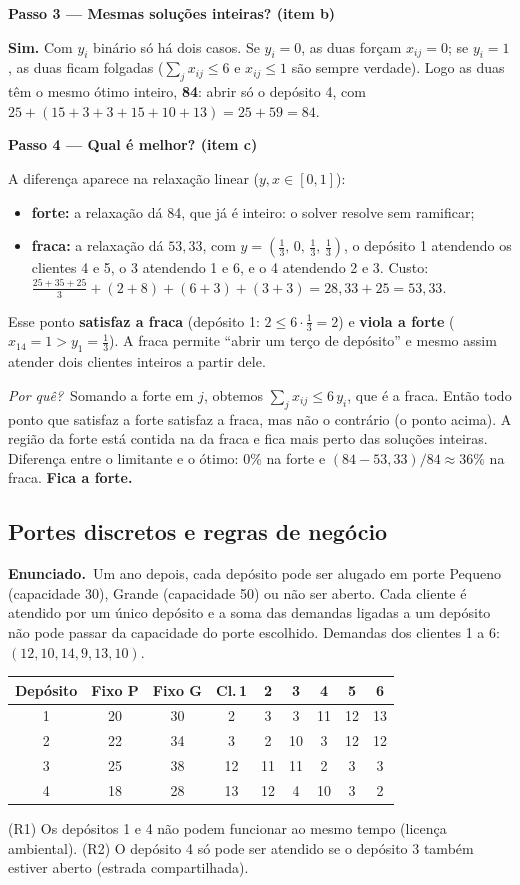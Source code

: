 \documentclass[11pt,a4paper]{article}
\newcommand{\enunciado}{\par\textbf{Enunciado.}\ }
\newcommand{\passo}[1]{\par\medskip\textbf{#1}\par}
\newcommand{\porque}{\textit{Por quê?}\ }
\begin{document}
\passo{Passo 3 --- Mesmas soluções inteiras? (item b)}
\textbf{Sim.} Com $y_i$ binário só há dois casos. Se $y_i=0$, as duas forçam $x_{ij}=0$; se $y_i=1$, as duas
ficam folgadas ($\sum_j x_{ij}\le6$ e $x_{ij}\le1$ são sempre verdade). Logo as duas têm o mesmo ótimo inteiro,
\textbf{84}: abrir só o depósito 4, com $25 + (15+3+3+15+10+13) = 25+59 = 84$.

\passo{Passo 4 --- Qual é melhor? (item c)}
A diferença aparece na relaxação linear ($y,x\in[0,1]$):
\begin{itemize}
  \item \textbf{forte:} a relaxação dá 84, que já é inteiro: o solver resolve sem ramificar;
  \item \textbf{fraca:} a relaxação dá $53{,}33$, com $y=(\tfrac13,\,0,\,\tfrac13,\,\tfrac13)$, o depósito 1 atendendo os
        clientes 4 e 5, o 3 atendendo 1 e 6, e o 4 atendendo 2 e 3. Custo:
        $\tfrac{25+35+25}{3} + (2+8)+(6+3)+(3+3) = 28{,}33+25 = 53{,}33$.
\end{itemize}
Esse ponto \textbf{satisfaz a fraca} (depósito 1: $2\le6\cdot\tfrac13=2$) e \textbf{viola a forte}
($x_{14}=1>y_1=\tfrac13$). A fraca permite ``abrir um terço de depósito'' e mesmo assim atender dois clientes
inteiros a partir dele.

\porque Somando a forte em $j$, obtemos $\sum_j x_{ij}\le6\,y_i$, que é a fraca. Então todo ponto que satisfaz
a forte satisfaz a fraca, mas não o contrário (o ponto acima). A região da forte está contida na da fraca e fica
mais perto das soluções inteiras. Diferença entre o limitante e o ótimo: 0\% na forte e
$(84-53{,}33)/84\approx36\%$ na fraca. \textbf{Fica a forte.}

\subsection{Portes discretos e regras de negócio}
\enunciado Um ano depois, cada depósito pode ser alugado em porte Pequeno (capacidade 30), Grande
(capacidade 50) ou não ser aberto. Cada cliente é atendido por um único depósito e a soma das demandas
ligadas a um depósito não pode passar da capacidade do porte escolhido. Demandas dos clientes 1 a 6:
$(12, 10, 14, 9, 13, 10)$.
\begin{center}
\begin{tabular}{ccc|cccccc}
\toprule
Depósito & Fixo P & Fixo G & Cl.\,1 & 2 & 3 & 4 & 5 & 6\\
\midrule
1 & 20 & 30 & 2 & 3 & 3 & 11 & 12 & 13\\
2 & 22 & 34 & 3 & 2 & 10 & 3 & 12 & 12\\
3 & 25 & 38 & 12 & 11 & 11 & 2 & 3 & 3\\
4 & 18 & 28 & 13 & 12 & 4 & 10 & 3 & 2\\
\bottomrule
\end{tabular}
\end{center}
(R1) Os depósitos 1 e 4 não podem funcionar ao mesmo tempo (licença ambiental). (R2) O depósito 4 só
pode ser atendido se o depósito 3 também estiver aberto (estrada compartilhada).
\end{document}
